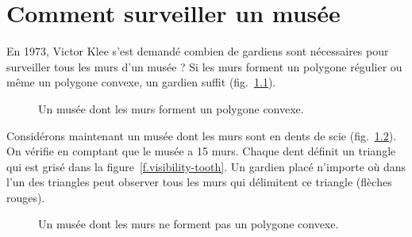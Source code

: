 \chapter{Comment surveiller un musée}\label{c.museum}





En 1973, Victor Klee s'est demandé combien de gardiens sont nécessaires pour surveiller tous les murs d'un musée ? Si les murs forment un polygone régulier ou même un polygone convexe, un gardien suffit (fig.~\ref{f.museum.convex}).

\begin{figure}[htbp]
\centering
{}
\caption{Un musée dont les murs forment un polygone convexe.}\label{f.museum.convex}
\end{figure}

Considérons maintenant un musée dont les murs sont en dents de scie (fig.~\ref{f.museum.nonconvex}). On vérifie en comptant que le musée a 15 murs. Chaque \og dent\fg{} définit un triangle qui est grisé  dans la figure~\ref{f.visibility-tooth}. Un gardien placé n'importe où dans l'un des triangles peut observer tous les murs qui délimitent ce triangle (flèches rouges).

\begin{figure}[htbp]
\centering
{}
\caption{Un musée dont les murs ne forment pas un polygone convexe.}
\label{f.museum.nonconvex}
\end{figure}

